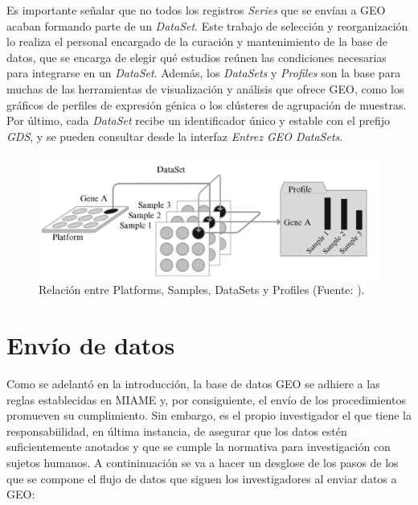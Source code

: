 Es importante señalar que no todos los registros \textit{Series} que se envían a GEO acaban formando parte de un \textit{DataSet}. Este trabajo de selección y reorganización 
lo realiza el personal encargado de la curación y mantenimiento de la base de datos, que se encarga de elegir qué estudios reúnen las condiciones necesarias para integrarse 
en un \textit{DataSet}. Además, los \textit{DataSets} y \textit{Profiles} son la base para muchas de las herramientas de visualización y análisis que ofrece GEO, como los 
gráficos de perfiles de expresión génica o los clústeres de agrupación de muestras. Por último, cada \textit{DataSet} recibe un identificador único y estable con el prefijo 
\textit{GDS}, y se pueden consultar desde la interfaz \textit{Entrez GEO DataSets}.

\begin{figure}[h]
    \centering
    \includegraphics[width=1\textwidth]{../img/geo-datasets.png}
    \caption{Relación entre Platforms, Samples, DataSets y Profiles (Fuente: \cite{geo-4}).}  %
\end{figure}


\section{Envío de datos}


Como se adelantó en la introducción, la base de datos GEO se adhiere a las reglas establecidas en MIAME y, por consiguiente, el envío de los procedimientos promueven
su cumplimiento. Sin embargo, es el propio investigador el que tiene la responsabiilidad, en última instancia, de asegurar que los datos estén suficientemente anotados y
que se cumple la normativa para investigación con sujetos humanos. A contininuación se va a hacer un desglose de los pasos de los que se compone el flujo de datos que siguen 
los investigadores al enviar datos a GEO:

